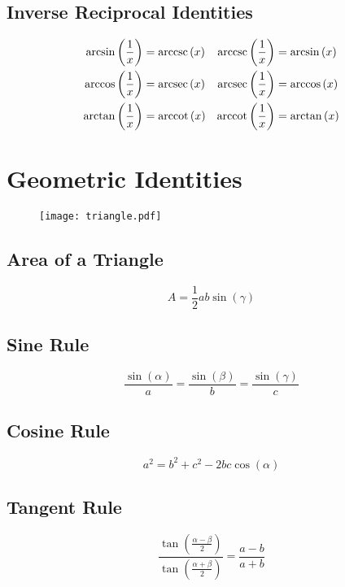 \documentclass{article}
\begin{document}
\subsection{Inverse Reciprocal Identities}
\begin{align*}
    \arcsin{\left( \frac{1}{x} \right)} &= \arccsc{\left( x \right)} & \arccsc{\left( \frac{1}{x} \right)} &= \arcsin{\left( x \right)} \\
    \arccos{\left( \frac{1}{x} \right)} &= \arcsec{\left( x \right)} & \arcsec{\left( \frac{1}{x} \right)} &= \arccos{\left( x \right)} \\
    \arctan{\left( \frac{1}{x} \right)} &= \arccot{\left( x \right)} & \arccot{\left( \frac{1}{x} \right)} &= \arctan{\left( x \right)} \\
\end{align*}
\section{Geometric Identities}
\begin{figure}[H]
	\centering
	\texttt{[image: triangle.pdf]}
\end{figure}
\subsection{Area of a Triangle}
\begin{equation*}
	A=\frac{1}{2}a b \sin{\left( \gamma \right)}
\end{equation*}
\subsection{Sine Rule}
\begin{equation*}
	\frac{\sin{\left( \alpha \right)}}{a} = \frac{\sin{\left( \beta \right)}}{b} = \frac{\sin{\left( \gamma \right)}}{c}
\end{equation*}
\subsection{Cosine Rule}
\begin{equation*}
	a^2=b^2+c^2-2b c\cos{\left( \alpha \right)}
\end{equation*}
\subsection{Tangent Rule}
\begin{equation*}
	\frac{\tan{\left( \frac{\alpha-\beta}{2} \right)}}{\tan{\left( \frac{\alpha+\beta}{2} \right)}} = \frac{a-b}{a+b}
\end{equation*}
\end{document}
